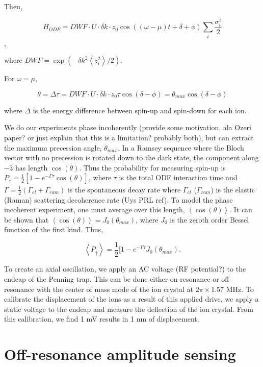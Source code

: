 \documentclass[aps,prl,preprint,groupedaddress]{revtex4-1}
\begin{document}
Then,

\[H_{ODF} = DWF \cdot U \cdot \delta k \cdot z_0\cos((\omega - \mu)t + \delta + \phi) \sum_{i} \frac{\sigma^{z}_{i}}{2} \],

where $DWF = \exp(-\delta k^2 \left< z^{2}_{i} \right> /2) $.

For $ \omega = \mu $,

\[\theta = \Delta\tau = DWF \cdot U \cdot \delta k \cdot z_0 \tau \cos(\delta - \phi) = \theta_{max}\cos(\delta - \phi)\]

where $\Delta$ is the energy difference between spin-up and spin-down for each ion.

We do our experiments phase incoherently (provide some motivation, ala Ozeri paper? or just explain that this is a limitation? probably both), but can extract the maximum precession angle, $\theta_{max}$. In a Ramsey sequence where the Bloch vector with no precession is rotated down to the dark state, the component along $-\hat{z}$ has length $\cos(\theta)$. Thus the probability for measuring spin-up is $P_{\uparrow} = \frac{1}{2}[1-e^{-\Gamma \tau} \cos(\theta)]$, where $\tau$ is the total ODF interaction time and $\Gamma = \frac{1}{2}(\Gamma_{el} + \Gamma_{ram})$ is the spontaneous decay rate where $\Gamma_{el}$ ($\Gamma_{ram}$) is the elastic (Raman) scattering decoherence rate (Uys PRL ref). To model the phase incoherent experiment, one must average over this length, $ \left< \cos(\theta) \right> $. It can be shown that $ \left< \cos(\theta) \right> = J_0(\theta_{max}) $, where $J_0$ is the zeroth order Bessel function of the first kind. Thus,

\begin{equation}
\left< P_{\uparrow} \right> = \frac{1}{2} [1-e^{-\Gamma \tau}J_0(\theta_{max}).
\end{equation}

To create an axial oscillation, we apply an AC voltage (RF potential?) to the endcap of the Penning trap. This can be done either on-resonance or off-resonance with the center of mass mode of the ion crystal at $2\pi \times 1.57$ MHz. To calibrate the displacement of the ions as a result of this applied drive, we apply a static voltage to the endcap and measure the deflection of the ion crystal. From this calibration, we find 1 mV results in 1 nm of displacement.


  
\section{Off-resonance amplitude sensing}
\end{document}
